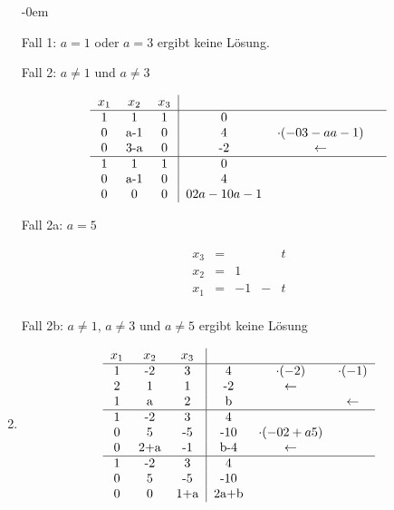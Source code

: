 \begin{enumerate}
						\abovedisplayskip-0em
						
						Fall 1: \emph{$a = 1$} oder \emph{$a = 3$} ergibt keine L\"osung.
						
						Fall 2: \emph{$a \neq 1$} und \emph{$a \neq 3$}
						
						\[
							\begin{tabular} {ccc|ccc}
								$x_1$ & $x_2$ & $x_3$ & & & \\
								\hline
								1 & 1 & 1 & 0 & & \\
								0 & a-1 & 0 & 4 & $\cdot(-\frac{3-a}{a-1})$ & \\
								0 & 3-a & 0 & -2 & $\leftarrow$ & \\
								\hline
								1 & 1 & 1 & 0 & & \\
								0 & a-1 & 0 & 4 & & \\
								0 & 0 & 0 & $\frac{2a-10}{a-1}$ & & \\
							\end{tabular}
						\]
						
						Fall 2a: \emph{$a = 5$}
						
						\[
							\begin{array} {ccccc}
								x_3 & = & & & t\\
								x_2 & = & 1 & & \\
								x_1 & = & -1 & - & t\\
							\end{array}
						\]
						
						Fall 2b: \emph{$a \neq 1$}, \emph{$a \neq 3$} und \emph{$a \neq 5$} ergibt keine L\"osung
						
					\item
						
						\[
							\begin{tabular} {ccc|ccc}
								$x_1$ & $x_2$ & $x_3$ & & & \\
								\hline
								1 & -2 & 3 & 4 & $\cdot(-2)$ & $\cdot(-1)$ \\
								2 & 1 & 1 & -2 & $\leftarrow$ & \\
								1 & a & 2 & b & & $\leftarrow$ \\
								\hline
								1 & -2 & 3 & 4 & & \\
								0 & 5 & -5 & -10 & $\cdot(-\frac{2+a}{5})$ & \\
								0 & 2+a & -1 & b-4 & $\leftarrow$ & \\
								\hline
								1 & -2 & 3 & 4 & & \\
								0 & 5 & -5 & -10 & & \\
								0 & 0 & 1+a & 2a+b & & \\
							\end{tabular}
						\]
						

\end{enumerate}
